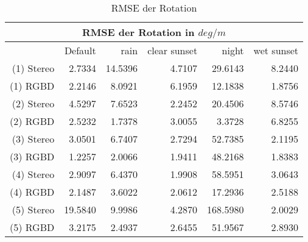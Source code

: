 
  \begin{table}
    \centering
      \begin{tabular}{r|r|r|r|r|r}
        \toprule %
        \multicolumn{6}{c}{RMSE der Rotation in $deg/m$} \\
        \midrule %
        \phantom{abc} & Default & rain& clear sunset & night & wet sunset\\
        \midrule %
        (1) Stereo & 2.7334 & 14.5396 & 4.7107 & 29.6143& 8.2440\\
        \rowcolor{LightGray}
        (1) RGBD & 2.2146 & 8.0921 & 6.1959 & 12.1838& 1.8756\\
        (2) Stereo & 4.5297 & 7.6523 & 2.2452 & 20.4506& 8.5746\\
        \rowcolor{LightGray}
        (2) RGBD & 2.5232 & 1.7378 & 3.0055 & 3.3728& 6.8255\\
        (3) Stereo & 3.0501 & 6.7407 & 2.7294 & 52.7385& 2.1195\\
        \rowcolor{LightGray}
        (3) RGBD & 1.2257 & 2.0066 &  1.9411 & 48.2168& 1.8383\\
        (4) Stereo & 2.9097 & 6.4370 & 1.9908 & 58.5951& 3.0643\\
        \rowcolor{LightGray}
        (4) RGBD & 2.1487 & 3.6022 & 2.0612 & 17.2936&2.5188\\
        (5) Stereo & 19.5840 &  9.9986 & 4.2870 & 168.5980& 2.0029\\
        \rowcolor{LightGray}
        (5) RGBD & 3.2175 & 2.4937 & 2.6455 & 51.9567& 2.8930\\	
        \bottomrule %
      \end{tabular}
    \caption{RMSE der Rotation}
  \end{table} 	
